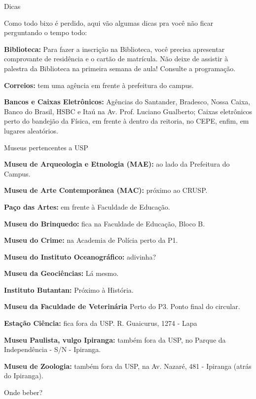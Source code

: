 \begin{secao}{Dicas}

Como todo bixo é perdido, aqui vão algumas dicas pra você não ficar perguntando o tempo todo:

{\bf Biblioteca:} Para fazer a inscrição na Biblioteca, você precisa
apresentar comprovante de residência e o cartão de matrícula. Não
deixe de assistir à palestra da Biblioteca na primeira semana de aula! Consulte a programação.

{\bf Correios:} tem uma agência em frente à prefeitura do campus.

{\bf Bancos e Caixas Eletrônicos:} Agências do Santander, Bradesco,
Nossa Caixa, Banco do Brasil, HSBC e Itaú na Av. Prof. Luciano
Gualberto; Caixas eletrônicos perto do bandejão da Física, em frente à dentro da reitoria, no CEPE, enfim, em lugares aleatórios.

\begin{subsecao}{Museus pertencentes a USP}

{\bf Museu de Arqueologia e Etnologia (MAE):} ao lado da Prefeitura do Campus.

{\bf Museu de Arte Contemporânea (MAC):} próximo ao CRUSP.

{\bf Paço das Artes:} em frente à Faculdade de Educação.

{\bf Museu do Brinquedo:} fica na Faculdade de Educação, Bloco B.

{\bf Museu do Crime:} na Academia de Polícia perto da P1.

{\bf Museu do Instituto Oceanográfico:} adivinha?

{\bf Museu da Geociências:} Lá mesmo.

{\bf Instituto Butantan:} Próximo à História.

{\bf Museu da Faculdade de Veterinária} Perto do P3. Ponto final do circular.

{\bf Estação Ciência:} fica fora da USP. R. Guaicurus, 1274 - Lapa

{\bf Museu Paulista, vulgo Ipiranga: }também fora da USP, no Parque da
Independência - S/N  - Ipiranga.

{\bf Museu de Zoologia: }também fora da USP, na Av. Nazaré, 481  -
Ipiranga (atrás do Ipiranga).

\end{subsecao}

\begin{subsecao}{Onde beber?}


\end{subsecao}
\end{secao}
